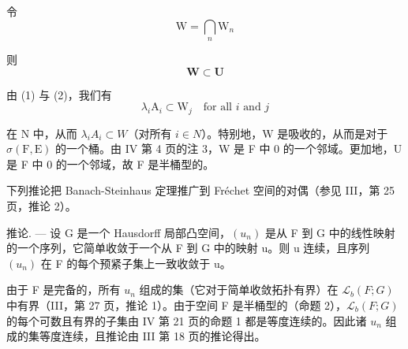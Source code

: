 令
\[
\mathrm{W} = \bigcap_ {n} \mathrm{W} _ {n}
\]

则
\[
\mathbf {W} \subset \mathbf {U}
\]

由 (1) 与 (2)，我们有
\[
\lambda_ {i} \mathrm{A} _ {i} \subset \mathrm{W} _ {j} \quad \text {for all } i \text { and } j
\]

在 N 中，从而 \(\lambda_{i}A_{i}\subset W\)（对所有 \(i\in N\)）。特别地，W 是吸收的，从而是对于 \(\sigma(\mathrm{F},\mathrm{E})\) 的一个桶。由 IV 第 4 页的注 3，W 是 F 中 0 的一个邻域。更加地，U 是 F 中 0 的一个邻域，故 F 是半桶型的。

下列推论把 Banach-Steinhaus 定理推广到 Fréchet 空间的对偶（参见 III，第 25 页，推论 2）。

推论. --- 设 G 是一个 Hausdorff 局部凸空间，\((u_{n})\) 是从 F 到 G 中的线性映射的一个序列，它简单收敛于一个从 F 到 G 中的映射 u。则 u 连续，且序列 \((u_{n})\) 在 F 的每个预紧子集上一致收敛于 u。

由于 F 是完备的，所有 \(u_{n}\) 组成的集（它对于简单收敛拓扑有界）在 \(\mathcal{L}_{b}(F;G)\) 中有界（III，第 27 页，推论 1）。由于空间 F 是半桶型的（命题 2），\(\mathcal{L}_{b}(F;G)\) 的每个可数且有界的子集由 IV 第 21 页的命题 1 都是等度连续的。因此诸 \(u_{n}\) 组成的集等度连续，且推论由 III 第 18 页的推论得出。

